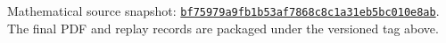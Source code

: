 \par\noindent\small Mathematical source snapshot: \href{https://github.com/Bome2017/bsd-seed-research/tree/bf75979a9fb1b53af7868c8c1a31eb5bc010e8ab}{\nolinkurl{bf75979a9fb1b53af7868c8c1a31eb5bc010e8ab}}. The final PDF and replay records are packaged under the versioned tag above.\normalsize
